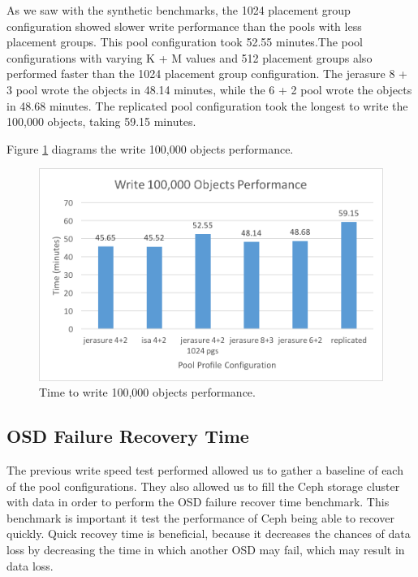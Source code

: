 \documentclass[conference,compsoc]{IEEEtran}
\begin{document}
As we saw with the synthetic benchmarks, the 1024 placement group configuration showed slower write performance than the pools with less placement groups. This pool configuration took 52.55 minutes.The pool configurations with varying K + M values and 512 placement groups also performed faster than the 1024 placement group configuration. The jerasure 8 + 3 pool wrote the objects in 48.14 minutes, while the 6 + 2 pool wrote the objects in 48.68 minutes. The replicated pool configuration took the longest to write the 100,000 objects, taking 59.15 minutes. 

Figure \ref{fig:100,000} diagrams the write 100,000 objects performance. 

\begin{figure}

\includegraphics[width=\linewidth]{100,000.png}
\caption{Time to write 100,000 objects performance.}
\label{fig:100,000}

\end{figure}

\subsection{OSD Failure Recovery Time}

The previous write speed test performed allowed us to gather a baseline of each of the pool configurations. They also allowed us to fill the Ceph storage cluster with data in order to perform the OSD failure recover time benchmark. This benchmark is important it test the performance of Ceph being able to recover quickly. Quick recovey time is beneficial, because it decreases the chances of data loss by decreasing the time in which another OSD may fail, which may result in data loss. 
\end{document}
